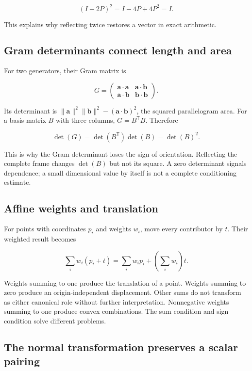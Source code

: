 \[
(I-2P)^2=I-4P+4P^2=I.
\]

This explains why reflecting twice restores a vector in exact arithmetic.

\subsection{Gram determinants connect length and area}\label{02-foundations-ii-ch039-gram-determinants-connect-length-and-area}

For two generators, their Gram matrix is

\[
G=\begin{pmatrix}\mathbf a\cdot\mathbf a&\mathbf a\cdot\mathbf b\\
\mathbf a\cdot\mathbf b&\mathbf b\cdot\mathbf b\end{pmatrix}.
\]

Its determinant is \(\|\mathbf a\|^2\|\mathbf b\|^2-(\mathbf a\cdot\mathbf b)^2\), the squared parallelogram area. For a basis matrix \(B\) with three columns, \(G=B^\mathsf TB\). Therefore

\[
\det(G)=\det(B^\mathsf T)\det(B)=\det(B)^2.
\]

This is why the Gram determinant loses the sign of orientation. Reflecting the complete frame changes \(\det(B)\) but not its square. A zero determinant signals dependence; a small dimensional value by itself is not a complete conditioning estimate.

\subsection{Affine weights and translation}\label{02-foundations-ii-ch039-affine-weights-and-translation}

For points with coordinates \(p_i\) and weights \(w_i\), move every contributor by \(t\). Their weighted result becomes

\[
\sum_iw_i(p_i+t)=\sum_iw_ip_i+\left(\sum_iw_i\right)t.
\]

Weights summing to one produce the translation of a point. Weights summing to zero produce an origin-independent displacement. Other sums do not transform as either canonical role without further interpretation. Nonnegative weights summing to one produce convex combinations. The sum condition and sign condition solve different problems.

\subsection{The normal transformation preserves a scalar pairing}\label{02-foundations-ii-ch039-the-normal-transformation-preserves-a-scalar-pairing}


